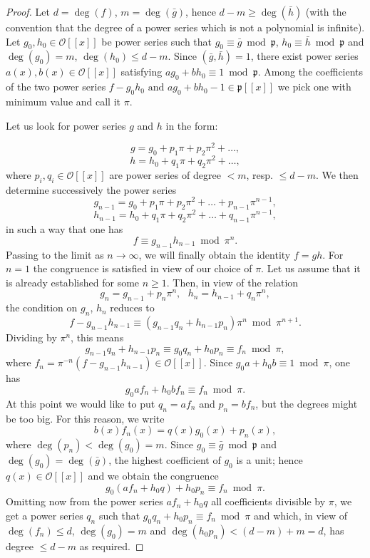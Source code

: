 \documentclass{article}
\begin{document}
\begin{proof}
Let $d = \deg(f)$, $m = \deg(\bar{g})$, hence $d - m \ge \deg(\bar{h})$ (with the convention that the degree of a power series which is not a polynomial is infinite). Let $g_0, h_0 \in \mathcal{O}[[x]]$ be power series such that $g_0 \equiv \bar{g} \bmod \mathfrak{p}$, $h_0 \equiv \bar{h} \bmod \mathfrak{p}$ and $\deg(g_0) = m$, $\deg(h_0) \le d-m$. Since $(
\bar{g}, \bar{h}) = 1$, there exist power series $a(x), b(x) \in \mathcal{O}[[x]]$ satisfying $ag_0 + bh_0 \equiv 1 \bmod \mathfrak{p}$.  Among the coefficients of the two power series $f-g_0h_0 \mbox{ and } ag_0 + bh_0 - 1 \in \mathfrak{p}[[x]]$ we pick one with minimum value and call it $\pi$.

Let us look for power series $g$ and $h$ in the form:

$$g = g_0 + p_1\pi + p_2\pi^2 + \ldots,$$
$$h = h_0 + q_1\pi + q_2\pi^2 + \ldots,$$
where $p_i, q_i \in \mathcal{O}[[x]]$ are power series of degree $< m$, resp. $\le d - m$.  We then determine successively the power series
$$g_{n-1} = g_0 + p_1\pi + p_2\pi^2 + \ldots + p_{n-1}\pi^{n-1},$$
$$h_{n-1} = h_0 + q_1\pi + q_2\pi^2 + \ldots + q_{n-1}\pi^{n-1},$$
in such a way that one has
$$f \equiv g_{n-1}h_{n-1} \bmod \pi^n.$$
Passing to the limit as $n \to \infty$, we will finally obtain the identity $f = gh$.  For $n=1$ the congruence is satisfied in view of our choice of $\pi$.  Let us assume that it is already established for some $n \ge 1$.  Then, in view of the relation
$$g_n = g_{n-1} + p_n\pi^n, \mbox{ } h_n = h_{n-1} + q_n\pi^n,$$
the condition on $g_n$, $h_n$ reduces to
$$f - g_{n-1}h_{n-1} \equiv (g_{n-1}q_n + h_{n-1}p_n)\pi^n \bmod \pi^{n+1}.$$
Dividing by $\pi^n$, this means
$$g_{n-1}q_n + h_{n-1}p_n \equiv g_0q_n + h_0p_n \equiv f_n \bmod \pi,$$
where $f_n = \pi^{-n}(f - g_{n-1}h_{n-1}) \in \mathcal{O}[[x]]$.  Since $g_0a + h_0b \equiv 1 \bmod \pi$, one has
$$g_0af_n + h_0bf_n \equiv f_n \bmod \pi.$$
At this point we would like to put $q_n = af_n$ and $p_n = bf_n$, but the degrees might be too big.  For this reason, we write
$$b(x)f_n(x) = q(x)g_0(x) + p_n(x),$$
where $\deg(p_n) < \deg(g_0) = m$.  Since $g_0 \equiv \bar{g} \bmod \mathfrak{p}$ and $\deg(g_0) = \deg(\bar{g})$, the highest coefficient of $g_0$ is a unit; hence $q(x) \in \mathcal{O}[[x]]$ and we obtain the congruence
$$g_0(af_n + h_0q) + h_0p_n \equiv f_n \bmod \pi.$$
Omitting now from the power series $af_n + h_0q$ all coefficients divisible by $\pi$, we get a power series $q_n$ such that $g_0q_n + h_0p_n \equiv f_n \bmod \pi$ and which, in view of $\deg(f_n) \le d$, $\deg(g_0) = m$ and $\deg(h_0p_n) < (d-m) + m = d$, has degree $\le d-m$ as required.
\end{proof}
\end{document}
